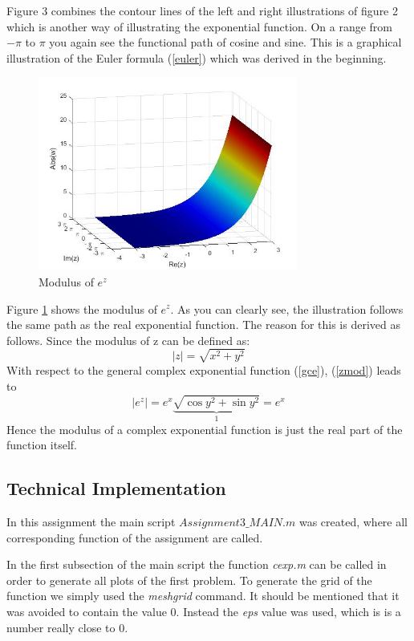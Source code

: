 \documentclass[a4paper,11pt]{article}
\begin{document}
Figure 3 combines the contour lines of the left and right illustrations of figure 2 which is another way of illustrating the exponential function. On a range from $-\pi$ to $\pi$ you again see the functional path of cosine and sine. This is a graphical illustration of the Euler formula (\ref{euler}) which was derived in the beginning.
 
\begin{figure}[!h]
\begin{center}
\includegraphics[width=8.5cm]{plot3.jpg}
\caption{Modulus of $e^z$}
\label{plot3}
\end{center}
\end{figure}
Figure \ref{plot3} shows the modulus of $e^z$. As you can clearly see, the illustration follows the same path as the real exponential function. The reason for this is derived as follows. Since the modulus of z can be defined as:
\begin{equation}
|z|=\sqrt{x^2 + y^2}
\label{zmod}
\end{equation}
With respect to the general complex exponential function (\ref{gce}), (\ref{zmod}) leads to
\begin{equation}
|e^{z}|=e^{x}\underbrace{\sqrt{\cos y^2+\sin y^2}}_1=e^x
\end{equation}
Hence the modulus of a complex exponential function is just the real part of the function itself.
\subsection{Technical Implementation}
In this assignment the main script \textit{$Assignment3\_MAIN.m$} was created, where all corresponding function of the assignment are called.

In the first subsection of the main script the function \textit{cexp.m} can be called in order to generate all plots of the first problem. To generate the grid of the function we simply used the \textit{meshgrid} command. It should be mentioned that it was avoided to contain the value 0. Instead the \textit{eps} value was used, which is is a number really close to 0.
\end{document}

